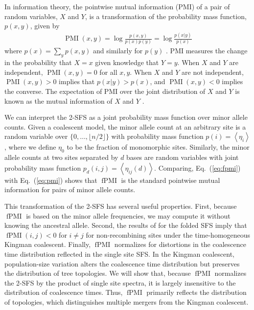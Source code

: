 \documentclass[11pt, letterpaper]{article}   	%
\newcommand{\eq}[1]{Eq.~(\ref{#1})}
\newcommand{\floor}[1]{\lfloor #1 \rfloor}
\newcommand{\E}[1]{\left< #1 \right>}
\DeclareMathOperator{\pmi}{PMI}
\DeclareMathOperator{\fpmi}{fPMI}
\begin{document}
In information theory, the pointwise mutual information (PMI) of a pair of random variables, $X$ and $Y$, is a transformation of the probability mass function, $p(x,y)$, given by
\begin{align}
    \pmi(x,y) = \log \frac{p(x,y)}{p(x)p(y)} = \log \frac{p(x|y)}{p(x)}
    \label{eq:pmi}
\end{align}
where $p(x) = \sum_y p(x,y)$ and similarly for $p(y)$ \autocite{ChurchHanks1990}.
PMI measures the change in the probability that $X=x$ given knowledge that $Y=y$.
When $X$ and $Y$ are independent, $\pmi(x,y) = 0$ for all $x,y$.
When $X$ and $Y$ are not independent, $\pmi(x,y) > 0$ implies that $p(x|y) > p(x)$, and $\pmi(x,y) < 0$ implies the converse.
The expectation of PMI over the joint distribution of $X$ and $Y$ is known as the mutual information of $X$ and $Y$ \autocite{CoverThomas1991}.

We can interpret the 2-SFS as a joint probability mass function over minor allele counts.
Given a coalescent model, the minor allele count at an arbitrary site is a random variable over $\{0,\ldots,\floor{n/2}\}$ with probability mass function $p(i) = \E{\eta_i}$, where we define $\eta_0$ to be the fraction of monomorphic sites.
Similarly, the minor allele counts at two sites separated by $d$ bases are random variables with joint probability mass function $p_d(i,j) = \E{\eta_{ij}(d)}$.
Comparing, \eq{eq:fpmi} with \eq{eq:pmi} shows that $\fpmi$ is the standard pointwise mutual information for pairs of minor allele counts.

This transformation of the 2-SFS has several useful properties.
First, because $\fpmi$ is based on the minor allele frequencies, we may compute it without knowing the ancestral allele.
Second, the results of \textcite{Fu1995} for the folded SFS imply that $\fpmi(i,j) < 0$ for $i\neq j$ for non-recombining sites under the time-homogeneous Kingman coalescent.
Finally, $\fpmi$ normalizes for distortions in the coalescence time distribution reflected in the single site SFS.
In the Kingman coalescent, population-size variation alters the coalescence time distribution but preserves the distribution of tree topologies.
We will show that, because $\fpmi$ normalizes the 2-SFS by the product of single site spectra, it is largely insensitive to the distribution of coalescence times.
Thus, $\fpmi$ primarily reflects the distribution of topologies, which distinguishes multiple mergers from the Kingman coalescent.
\end{document}
